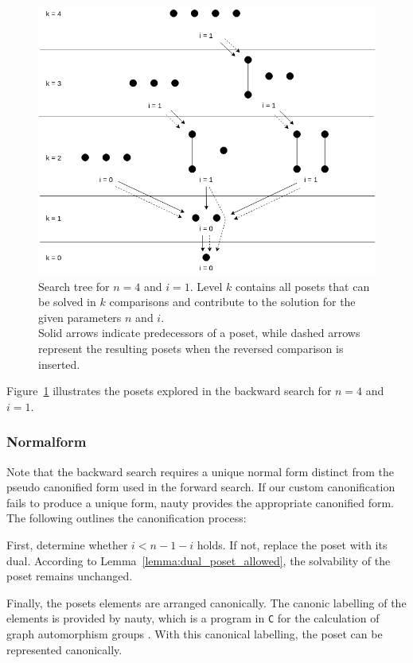 \documentclass[twoside,leqno,twocolumn]{article}
\begin{document}
\begin{figure}[!b]
  \centering
  \includegraphics[width=\columnwidth]{figures/backward-search-tree.png}
  \caption{Search tree for $n = 4$ and $i = 1$.
    Level $k$ contains all posets that can be solved in $k$ comparisons and contribute to the solution for the given parameters $n$ and $i$. \\
    Solid arrows indicate predecessors of a poset, while dashed arrows represent the resulting posets when the reversed comparison is inserted.}
  \label{fig:backward-search-tree}
\end{figure}

Figure~\ref{fig:backward-search-tree} illustrates the posets explored in the backward search for $n = 4$ and $i = 1$.

\subsubsection{Normalform} \label{sec:backward:normal_form}
Note that the backward search requires a unique normal form distinct from the pseudo canonified form used in the forward search.
If our custom canonification fails to produce a unique form, nauty provides the appropriate canonified form.
The following outlines the canonification process:

First, determine whether $i < n - 1 - i$ holds.
If not, replace the poset with its dual.
According to Lemma~\ref{lemma:dual_poset_allowed}, the solvability of the poset remains unchanged.

Finally, the posets elements are arranged canonically. %
The canonic labelling of the elements is provided by nauty, which is a program in \texttt{C} for the calculation of graph automorphism groups \cite[Practical Graph Isomorphism]{MCKAY201494}.
With this canonical labelling, the poset can be represented canonically.
\end{document}
